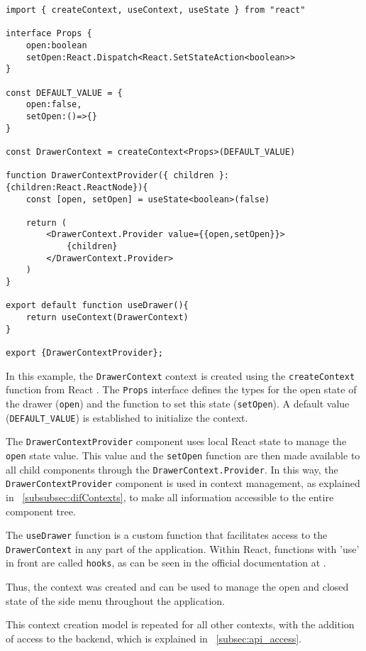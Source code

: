 \begin{verbatim}
import { createContext, useContext, useState } from "react"

interface Props {
    open:boolean
    setOpen:React.Dispatch<React.SetStateAction<boolean>>
}

const DEFAULT_VALUE = {
    open:false,
    setOpen:()=>{}
}

const DrawerContext = createContext<Props>(DEFAULT_VALUE)

function DrawerContextProvider({ children }:{children:React.ReactNode}){
    const [open, setOpen] = useState<boolean>(false)

    return (
        <DrawerContext.Provider value={{open,setOpen}}>
            {children}
        </DrawerContext.Provider>
    )
}

export default function useDrawer(){
    return useContext(DrawerContext)
}

export {DrawerContextProvider};
\end{verbatim}

In this example, the \texttt{DrawerContext} context is created using the \texttt{createContext} function from React \cite{reactCreateContext}. The \texttt{Props} interface defines the types for the open state of the drawer (\texttt{open}) and the function to set this state (\texttt{setOpen}). A default value (\texttt{DEFAULT\_VALUE}) is established to initialize the context.

The \texttt{DrawerContextProvider} component uses local React state to manage the \texttt{open} state value. This value and the \texttt{setOpen} function are then made available to all child components through the \texttt{DrawerContext.Provider}. In this way, the \texttt{DrawerContextProvider} component is used in context management, as explained in ~\ref{subsubsec:difContexts}, to make all information accessible to the entire component tree.

The \texttt{useDrawer} function is a custom function that facilitates access to the \texttt{DrawerContext} in any part of the application. Within React, functions with 'use' in front are called \texttt{hooks}, as can be seen in the official documentation at \cite{reactHooksReference}.

Thus, the context was created and can be used to manage the open and closed state of the side menu throughout the application.

This context creation model is repeated for all other contexts, with the addition of access to the backend, which is explained in ~\ref{subsec:api_access}.

